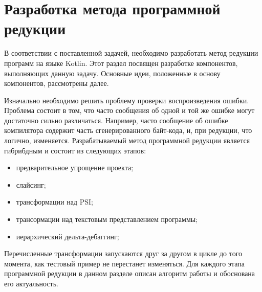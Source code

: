 \chapter{Разработка метода программной редукции}
В соответствии с поставленной задачей, необходимо разработать метод редукции программ на языке Kotlin. Этот раздел посвящен разработке компонентов, выполняющих данную задачу. Основные идеи, положенные в основу компонентов, рассмотрены далее.

Изначально необходимо решить проблему проверки воспроизведения ошибки. Проблема состоит в том, что часто сообщения об одной и той же ошибке могут достаточно сильно различаться. Например, часто сообщение об ошибке компилятора содержит часть сгенерированного байт-кода, и, при редукции, что логично, изменяется. 
Разрабатываемый метод программной редукции является гибрибдным и состоит из следующих этапов: 
\begin{itemize}
	\item предварительное упрощение проекта;
	\item слайсинг;
	\item трансформации над PSI;
	\item трансормации над текстовым представлением программы;
	\item иерархический дельта-дебаггинг;
\end{itemize}
Перечисленные трансформации запускаются друг за другом в цикле до того момента, как тестовый пример не перестанет изменяться. Для каждого этапа программной редукции в данном разделе описан алгоритм работы и обоснована его актуальность.

